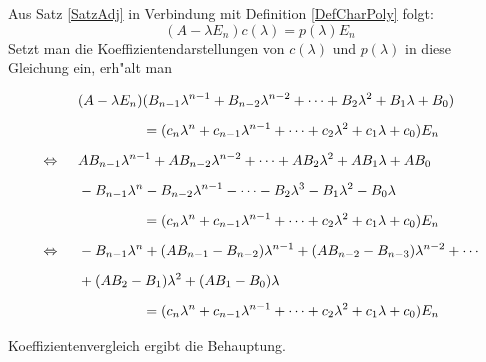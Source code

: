 \begin{beweis}
    Aus Satz \ref{SatzAdj} in Verbindung mit Definition \ref{DefCharPoly}
    folgt:
    \[ (A - \lambda E_n) c(\lambda) = p(\lambda) E_n \]
    Setzt man die Koeffizientendarstellungen von $c(\lambda)$ und
    $p(\lambda)$ in diese Gleichung ein, erh"alt man
    \[
    \begin{array}{p{1.8em}p{3.6em}l}
    & \multicolumn{2}{l}{
          \DS (A - \lambda E_n) (B_{n-1} \lambda^{n-1} + 
               B_{n-2} \lambda^{n-2} + \cdots + 
               B_2 \lambda^2 + B_1 \lambda + B_0) \MatStrut
      } 
    \\ & & \DS \MatStrut
        = (c_n \lambda^n + c_{n-1} \lambda^{n-1} + \cdots
                       + c_2 \lambda^2 + c_1 \lambda + c_0 ) E_n
    \\ \mbox{ $\DS \Leftrightarrow$ } & 
       \multicolumn{2}{l}{ \MatStrut
           \DS AB_{n-1} \lambda^{n-1} + AB_{n-2} \lambda^{n-2} +
                       \cdots + AB_2 \lambda^2 + AB_1 \lambda + AB_0
       }
    \\ &
       \multicolumn{2}{l}{ \MatStrut
           \DS - B_{n-1} \lambda^{n} - B_{n-2} \lambda^{n-1} -
                       \cdots - B_2 \lambda^3 - B_1 \lambda^2 - B_0 \lambda
       }
    \\ & & \DS \MatStrut
       = (c_n \lambda^n + c_{n-1} \lambda^{n-1} + \cdots
                   + c_2 \lambda^2 + c_1 \lambda + c_0 ) E_n
    \\ \mbox{ $\DS \Leftrightarrow$ } & 
       \multicolumn{2}{l}{ \MatStrut
           \DS - B_{n-1} \lambda^{n} + (AB_{n-1} - B_{n-2}) \lambda^{n-1} +
               (AB_{n-2} - B_{n-3}) \lambda^{n-2} + \cdots 
       }
    \\ &
       \multicolumn{2}{l}{ \MatStrut
           \DS + (AB_2 - B_1) \lambda^2 + (AB_1 - B_0) \lambda
       }
    \\ & & \DS \MatStrut
       = (c_n \lambda^n + c_{n-1} \lambda^{n-1} + \cdots
                         + c_2 \lambda^2 + c_1 \lambda + c_0 ) E_n
    \end{array}
    \]
    Koeffizientenvergleich ergibt die Behauptung.
\end{beweis}

